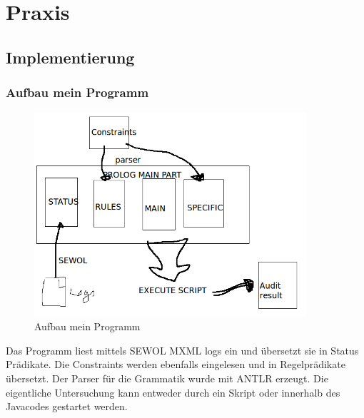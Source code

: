 
\chapter{Praxis} %

\label{Chapter5} %



\section{Implementierung}


%
%
\subsection{Aufbau mein Programm}

\begin{figure}[ht]
	\centering
  \includegraphics[width=0.9\textwidth]{Figures/myProg}
	\caption{Aufbau mein Programm}
	\label{fig: myprog}
\end{figure}

Das Programm liest mittels SEWOL MXML logs ein und übersetzt sie in Status Prädikate. 
Die Constraints werden ebenfalls eingelesen und in Regelprädikate übersetzt. Der Parser für die Grammatik wurde mit ANTLR\cite{antlr} erzeugt.
Die eigentliche Untersuchung kann entweder durch ein Skript oder innerhalb des Javacodes gestartet werden.

